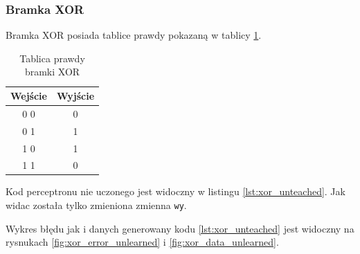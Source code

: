 \documentclass[pointlessnumbers, abstracton, headsepline, a4paper]{scrartcl}
\begin{document}
\subsubsection{Bramka XOR}

Bramka XOR posiada tablice prawdy pokazaną w tablicy \ref{tab:xor}.

\begin{table}[h]
\centering
\begin{tabular}[t]{c|c}
Wejście & Wyjście \\
\hline
0 0 & 0 \\
0 1 & 1 \\
1 0 & 1 \\
1 1 & 0 \\
\end{tabular}
\caption{\label{tab:xor}Tablica prawdy bramki XOR}
\end{table}

Kod perceptronu nie uczonego jest widoczny w listingu \ref{lst:xor_unteached}. Jak widac została tylko zmieniona zmienna \texttt{wy}.

\begin{center}
\begin{minipage}{0.5\textwidth}
\lstset{captionpos=b,caption=Kod nie uczonej bramki XOR,label=lst:xor_unteached}

\end{minipage}
\end{center}

Wykres błędu jak i danych generowany kodu \ref{lst:xor_unteached} jest widoczny na rysnukach \ref{fig:xor_error_unlearned} i \ref{fig:xor_data_unlearned}.
\end{document}
